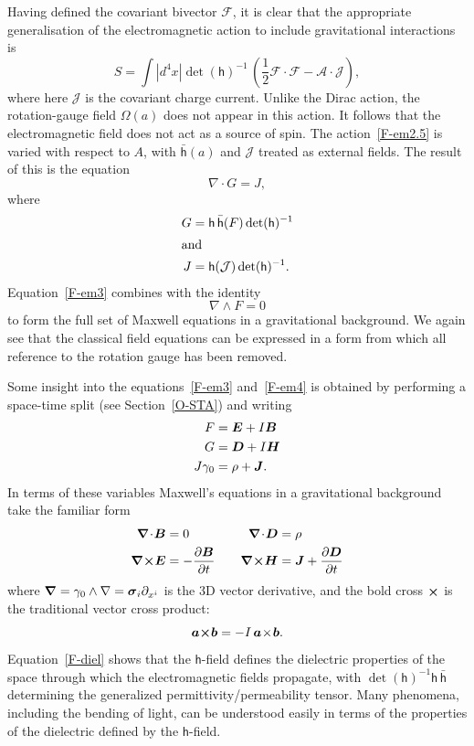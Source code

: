 \documentclass[a4paper]{article}
\numberwithin{equation}{section}
\newcommand{\bld}[1]{\mbox{\boldmath $#1$}}
\newcommand{\dt}{\! \cdot \!}
\newcommand{\wdg}{\! \wedge \!}
\newcommand{\crs}{\! \times \!}
\newcommand{\half}{{\textstyle \frac{1}{2}}}
\newcommand{\btimes}{\mbox{\boldmath $\times$}}
\newcommand{\eqv}{=}
\newcommand{\sig}{\mbox{\boldmath $\sigma$}}
\newcommand{\Om}{\Omega}
\newcommand{\ba}{\mbox{\boldmath $a$}}
\newcommand{\bb}{\mbox{\boldmath $b$}}
\newcommand{\bB}{\mbox{\boldmath $B$}}
\newcommand{\bD}{\mbox{\boldmath $D$}}
\newcommand{\bE}{\mbox{\boldmath $E$}}
\newcommand{\bH}{\mbox{\boldmath $H$}}
\newcommand{\bJ}{\mbox{\boldmath $J$}}
\newcommand{\cla}{{\mathcal{A}}}
\newcommand{\clf}{{\mathcal{F}}}
\newcommand{\clj}{{\mathcal{J}}}
\newcommand{\go}{\gamma_{0}}
\newcommand{\lih}{\mathsf{h}}
\newcommand{\lbh}{\bar{\mathsf{h}}}
\newcommand{\ho}{\lbh}
\newcommand{\hu}{\lih}
\newcommand{\grad}{\nabla}
\newcommand{\bgrad}{\mbox{\boldmath $\grad$}}
\newcommand{\deriv}[2]{\frac{\partial #1}{\partial #2}}
\newcommand{\dhi}{\det(\hu)^{-1}}
\newcommand{\hint}{\int |d^4x| \dhi \,}
\begin{document}
Having defined the covariant bivector $\clf$, it is clear that the
appropriate generalisation of the electromagnetic action to include
gravitational interactions is
%
\begin{equation}
S = \hint (\half \clf \dt \clf - \cla \dt \clj ),
\label{F-em2.5}
\end{equation}
%
where here $\clj$ is the covariant charge current.  Unlike the Dirac
action, the rotation-gauge field $\Om(a)$ does not appear in this
action.  It follows that the electromagnetic field does not act as a
source of spin.  The action~\eqref{F-em2.5} is varied with respect to $A$,
with $\ho(a)$ and $\clj$ treated as external fields.  The result of
this is the equation
%
\begin{equation}
\grad \dt G = J,
\label{F-em3}
\end{equation}
%
where
%
\begin{align}
G &\eqv \hu\, \ho(F) \dhi \\
%
\intertext{and}
%
J &\eqv \hu(\clj) \dhi.
\end{align}
%
Equation~\eqref{F-em3} combines with the identity 
%
\begin{equation}
\grad\wdg F=0
\label{F-em4}
\end{equation}
%
to form the full set of Maxwell equations in a gravitational
background.  We again see that the classical field equations can be
expressed in a form from which all reference to the rotation gauge has
been removed.


Some insight into the equations~\eqref{F-em3} and~\eqref{F-em4} is obtained by
performing a space-time split (see Section~\ref{O-STA}) and writing 
%
\begin{align}
F &= \bE + I\bB \\
G &= \bD +I\bH \\
J\go &= \rho + \bJ.
\end{align}
%
In terms of these variables Maxwell's equations in a gravitational
background take the familiar form
%
\begin{equation}
\begin{alignedat}{2}
\bgrad \dt \bld{B} &= 0 &\qquad \bgrad \dt \bld{D} &= \rho \\
\bgrad \btimes \bE &= - \deriv{\bB}{t}  &\qquad 
\bgrad \btimes \bH &= \bJ +\deriv{\bD}{t}
\end{alignedat}
\label{F-diel}
\end{equation} 
%
where $\bgrad=\go\wedge\grad=\sig_i\partial_{x^i}$ is the 3D vector
derivative, and the bold cross $\btimes$ is the traditional
vector cross product:
%
\begin{equation}
\ba \btimes \bb = -I \, \ba \crs \bb.
\end{equation}
%
Equation~\eqref{F-diel} shows that the $\lih$-field defines the dielectric
properties of the space through which the electromagnetic fields
propagate, with $\dhi\hu\,\ho$ determining the generalized
permittivity/permeability tensor.  Many phenomena, including the
bending of light, can be understood easily in terms of the properties
of the dielectric defined by the $\lih$-field.
\end{document}
